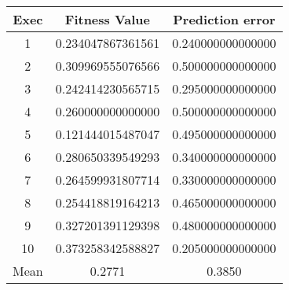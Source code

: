 \begin{table}[H]
\centering
\begin{tabular}{ccc}
\hline
Exec                     & Fitness Value                          & Prediction error                       \\ \hline
\multicolumn{1}{|c|}{1}  & \multicolumn{1}{c|}{0.234047867361561} & \multicolumn{1}{c|}{0.240000000000000} \\ \hline
\multicolumn{1}{|c|}{2}  & \multicolumn{1}{c|}{0.309969555076566} & \multicolumn{1}{c|}{0.500000000000000} \\ \hline
\multicolumn{1}{|c|}{3}  & \multicolumn{1}{c|}{0.242414230565715} & \multicolumn{1}{c|}{0.295000000000000} \\ \hline
\multicolumn{1}{|c|}{4}  & \multicolumn{1}{c|}{0.260000000000000} & \multicolumn{1}{c|}{0.500000000000000} \\ \hline
\multicolumn{1}{|c|}{5}  & \multicolumn{1}{c|}{0.121444015487047} & \multicolumn{1}{c|}{0.495000000000000} \\ \hline
\multicolumn{1}{|c|}{6}  & \multicolumn{1}{c|}{0.280650339549293} & \multicolumn{1}{c|}{0.340000000000000} \\ \hline
\multicolumn{1}{|c|}{7}  & \multicolumn{1}{c|}{0.264599931807714} & \multicolumn{1}{c|}{0.330000000000000} \\ \hline
\multicolumn{1}{|c|}{8}  & \multicolumn{1}{c|}{0.254418819164213} & \multicolumn{1}{c|}{0.465000000000000} \\ \hline
\multicolumn{1}{|c|}{9}  & \multicolumn{1}{c|}{0.327201391129398} & \multicolumn{1}{c|}{0.480000000000000} \\ \hline
\multicolumn{1}{|c|}{10} & \multicolumn{1}{c|}{0.373258342588827} & \multicolumn{1}{c|}{0.205000000000000} \\ \hline
Mean                     & 0.2771                                 & 0.3850                                 \\ \hline
\end{tabular}
\end{table}